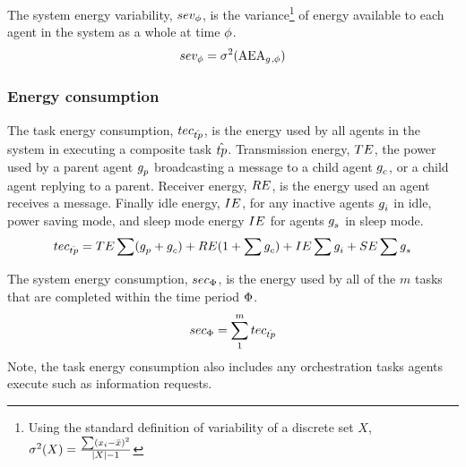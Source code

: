 \begin{definition}
	The system energy variability, $sev_{\phi}$, is the variance\footnote{Using the standard definition of variability of a discrete set $X$, $\sigma^2(X) = \frac{\sum (x_i - \bar{x})^2}{\lvert X \rvert-1}$} of energy available to each agent in the system as a whole at time $\phi$.
	\begin{equation}
		sev_{\phi} 
		= \sigma^2(\mathrm{AEA}_{g_{}^{},\phi})
	\end{equation}
\end{definition}

\subsubsection{Energy consumption}

\begin{definition}
	The task energy consumption, $tec_{\hat{tp}}$, is the energy used by all agents in the system in executing a composite task $\hat{tp}$. Transmission energy, $TE$, the power used by a parent agent $g_{p}^{}$ broadcasting a message to a child agent $g_{c}^{}$, or a child agent replying to a parent. Receiver energy, $RE$, is the energy used an agent receives a message. Finally idle energy, $IE$, for any inactive agents $g_{i}^{}$ in idle, power saving mode, and sleep mode energy $IE$ for agents $g_{s}^{}$ in sleep mode.
   	\begin{equation}
   		tec_{\hat{tp}} 
   		= TE \sum (g_{p}^{} + g_{c}^{})
   		+ RE (1 + \sum g_{c}^{})
   		+ IE \sum g_{i}^{}
   		+ SE \sum g_{s}^{}
   	\end{equation}
\end{definition}



\begin{definition}
	The system energy consumption, $sec_{\Phi}$, is the energy used by all of the $m$ tasks that are completed within the time period $\Phi$.
	\begin{equation}
		sec_{\Phi} 
		= \sum_{1}^{m} tec_{\hat{tp}}
	\end{equation}
	Note, the task energy consumption also includes any orchestration tasks agents execute such as information requests.
\end{definition}

